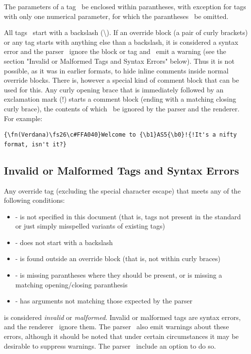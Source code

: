 \documentclass{spec}
\begin{document}
The parameters of a tag \must\ be enclosed within parantheses, with exception for tags with only one numerical
parameter, for which the parantheses \may\ be omitted.

All tags \must\ start with a backslash (\textbackslash ). If an override block (a pair of curly brackets)
or any tag starts with anything else than a backslash, it is considered a syntax error and the parser \must\
ignore the block or tag and \should\ emit a warning (see the section "Invalid or Malformed Tags and Syntax Errors"
below). Thus it is not possible, as it was in earlier formats, to hide inline comments inside normal override blocks.
There is, however a special kind of comment block that can be used for this. Any curly opening brace that is
immediately followed by an exclamation mark (!) starts a comment block (ending with a matching closing curly brace),
the contents of which \must\ be ignored by the parser and the renderer.
For example:

\begin{verbatim}
{\fn(Verdana)\fs26\c#FFA040}Welcome to {\b1}AS5{\b0}!{!It's a nifty format, isn't it?}
\end{verbatim}


\subsection{Invalid or Malformed Tags and Syntax Errors}
Any override tag (excluding the special character escape) that meets any of the following conditions:
\begin{itemize}
\item - is not specified in this document (that is, tags not present in the standard or just simply
misspelled variants of existing tags)
\item - does not start with a backslash
\item - is found outside an override block (that is, not within curly braces)
\item - is missing parantheses where they should be present, or is missing a matching opening/closing paranthesis
\item - has arguments not matching those expected by the parser
\end{itemize}
is considered \emph{invalid} or \emph{malformed}. Invalid or malformed tags are syntax errors, and the renderer
\must\ ignore them. The parser \should\ also emit warnings about these errors, although it should be noted that
under certain circumstances it may be desirable to suppress warnings. The parser \should\ include an option to do so.
\end{document}
